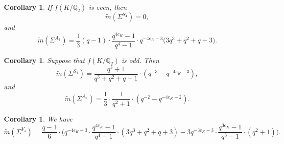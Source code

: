 \documentclass[11pt]{amsart}
\theoremstyle{theorem}
\newtheorem{corollary}[theorem]{Corollary}
\theoremstyle{example}
\theoremstyle{definition}
\numberwithin{theorem}{section}
\numberwithin{theorem}{section}
\newcommand{\Q}{\mathbb{Q}}
\newcommand{\m}{\widetilde{m}}
\begin{document}
\begin{corollary}
    \label{cor-premass-of-S4-A4-f-even}
    If $f(K/\Q_2)$ is even, then 
    $$
    \m(\Sigma^{S_4}) = 0,
    $$
    and
    $$
    \m(\Sigma^{A_4}) = 
    \frac{1}{3}(q-1)\cdot\frac{q^{4e_K}-1}{q^4-1}\cdot q^{-4e_K-3}\Big(
        3q^3 + q^2 + q + 3
    \Big).
    $$
\end{corollary}
\begin{corollary}
    \label{cor-premass-of-S4-A4-f-odd}
    Suppose that $f(K/\Q_2)$ is odd. Then 
    $$
    \m(\Sigma^{S_4}) = \frac{q^3 + 1}{q^3 + q^2 + q + 1}\cdot (q^{-3} - q^{-4e_K - 3}),
    $$
    and 
    $$
    \m(\Sigma^{A_4}) = \frac{1}{3}\cdot \frac{1}{q^2 + 1}\cdot (q^{-2} - q^{-4e_K - 2}).
    $$
\end{corollary}
\begin{corollary}
    \label{cor-premass-C2xC2}
    We have 
    $$
    \m(\Sigma^{V_4}) = \frac{q-1}{6}\cdot \Big(q^{-4e_K-3}\cdot \frac{q^{4e_K} - 1}{q^4 - 1} \cdot (3q^3 + q^2 + q + 3) - 3 q^{-3e_K - 3}\cdot \frac{q^{3e_K} - 1}{q^3 - 1} \cdot (q^2 + 1)\Big).
    $$
\end{corollary}
\end{document}
